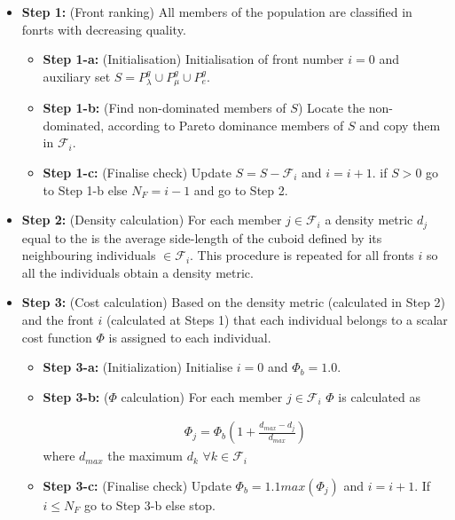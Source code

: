 \begin{itemize}
\item[]{\bf Step 1:}  (Front ranking) All members of the population are classified in fonrts with decreasing quality.  
\begin{itemize}
\item[]{\bf Step 1-a:}  (Initialisation) Initialisation of front number $i=0$ and auxiliary set $S=P_{\lambda}^g \cup P_{\mu}^g \cup P_{e}^g$.

\item[]{\bf Step 1-b:}  (Find non-dominated members of $S$) Locate the non-dominated, according to Pareto dominance members of $S$ and copy them in $\mathcal{F}_i$. 

\item[]{\bf Step 1-c:}  (Finalise check) Update $S=S-\mathcal{F}_i$ and $i=i+1$. if $S>0$ go to Step 1-b else $N_F=i-1$ and go to Step 2.
\end{itemize}
\item[]{\bf Step 2:}  (Density calculation) For each member $j \in \mathcal{F}_i$ a density metric $d_j$ equal to the is the average side-length of the cuboid defined by its neighbouring individuals $\in \mathcal{F}_i$. This procedure is repeated for all fronts $i$ so all the individuals obtain a density metric.

\item[]{\bf Step 3:}  (Cost calculation) Based on the density metric (calculated in Step 2) and the front $i$ (calculated at Steps 1) that each individual belongs to a scalar cost function $\Phi$ is assigned to each individual.
\begin{itemize}
\item[]{\bf Step 3-a:}  (Initialization) Initialise $i=0$ and $\Phi_b=1.0$.
\item[]{\bf Step 3-b:}  ($\Phi$ calculation) For each member $j \in \mathcal{F}_i$ $\Phi$ is calculated as

\begin{eqnarray}
	\nonumber
	\Phi_j= \Phi_b(1+\frac{d_{max}-d_j}{d_{max}}) 
\end{eqnarray} 
where $d_{max}$ the maximum $d_k$ $\forall k \in \mathcal{F}_i$   
\item[]{\bf Step 3-c:}  (Finalise check) Update $\Phi_b=1.1max(\Phi_j)$ and $i=i+1$. If $i \leq N_F$ go to Step 3-b else stop. 
\end{itemize}
 

\end{itemize}

